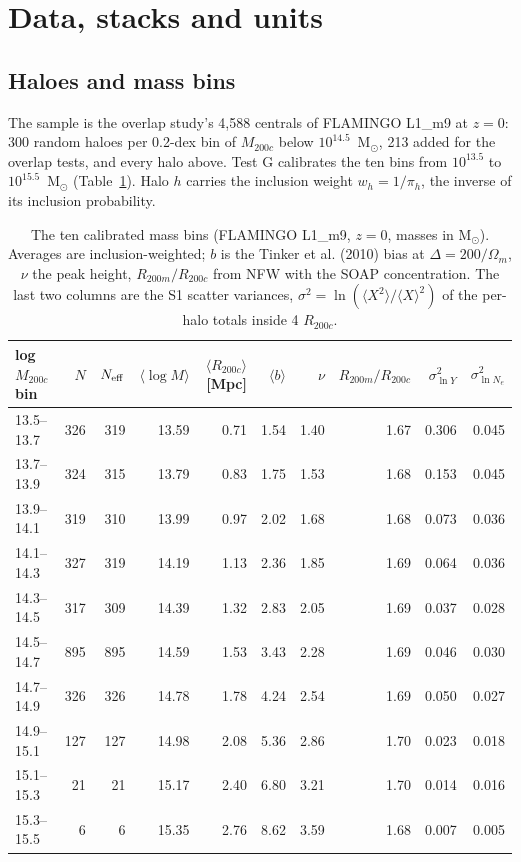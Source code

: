 \documentclass[10pt,a4paper]{article}
\begin{document}
\tableofcontents

\section{Data, stacks and units}\label{sec:data}

\subsection{Haloes and mass bins}
The sample is the overlap study's 4,588 centrals of FLAMINGO L1\_m9 at $z=0$: 300 random haloes per 0.2-dex bin of
$M_{200c}$ below $10^{14.5}$~M$_\odot$, 213 added for the overlap tests, and every halo above. Test G calibrates the ten
bins from $10^{13.5}$ to $10^{15.5}$~M$_\odot$ (Table~\ref{tab:bins}). Halo $h$ carries the inclusion weight
$w_h=1/\pi_h$, the inverse of its inclusion probability.

\begin{table}[H]
\centering
\footnotesize
\caption{The ten calibrated mass bins (FLAMINGO L1\_m9, $z=0$, masses in M$_\odot$). Averages are inclusion-weighted; $b$ is the Tinker et al. (2010) bias at $\Delta=200/\Omega_m$, $\nu$ the peak height, $R_{200m}/R_{200c}$ from NFW with the SOAP concentration. The last two columns are the S1 scatter variances, $\sigma^2=\ln(\langle X^2\rangle/\langle X\rangle^2)$ of the per-halo totals inside 4 $R_{200c}$.}
\label{tab:bins}
\begin{tabular}{lrrrrrrrrr}
\toprule
log $M_{200c}$ bin & $N$ & $N_{\rm eff}$ & $\langle\log M\rangle$ & $\langle R_{200c}\rangle$ [Mpc] & $\langle b\rangle$ & $\nu$ & $R_{200m}/R_{200c}$ & $\sigma^2_{\ln Y}$ & $\sigma^2_{\ln N_e}$ \\
\midrule
13.5--13.7 & 326 & 319 & 13.59 & 0.71 & 1.54 & 1.40 & 1.67 & 0.306 & 0.045 \\
13.7--13.9 & 324 & 315 & 13.79 & 0.83 & 1.75 & 1.53 & 1.68 & 0.153 & 0.045 \\
13.9--14.1 & 319 & 310 & 13.99 & 0.97 & 2.02 & 1.68 & 1.68 & 0.073 & 0.036 \\
14.1--14.3 & 327 & 319 & 14.19 & 1.13 & 2.36 & 1.85 & 1.69 & 0.064 & 0.036 \\
14.3--14.5 & 317 & 309 & 14.39 & 1.32 & 2.83 & 2.05 & 1.69 & 0.037 & 0.028 \\
14.5--14.7 & 895 & 895 & 14.59 & 1.53 & 3.43 & 2.28 & 1.69 & 0.046 & 0.030 \\
14.7--14.9 & 326 & 326 & 14.78 & 1.78 & 4.24 & 2.54 & 1.69 & 0.050 & 0.027 \\
14.9--15.1 & 127 & 127 & 14.98 & 2.08 & 5.36 & 2.86 & 1.70 & 0.023 & 0.018 \\
15.1--15.3 & 21 & 21 & 15.17 & 2.40 & 6.80 & 3.21 & 1.70 & 0.014 & 0.016 \\
15.3--15.5 & 6 & 6 & 15.35 & 2.76 & 8.62 & 3.59 & 1.68 & 0.007 & 0.005 \\
\bottomrule
\end{tabular}
\end{table}
\end{document}
